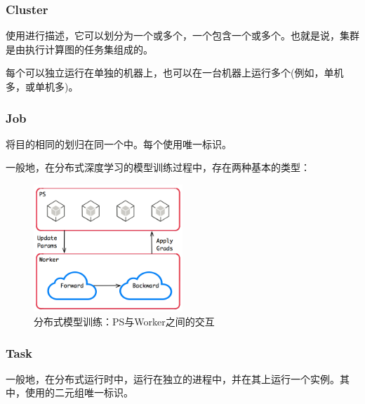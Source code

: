 \begin{content}
\subsubsection{Cluster}

使用进行描述，它可以划分为一个或多个，一个包含一个或多个。也就是说，集群是由执行计算图的任务集组成的。

每个可以独立运行在单独的机器上，也可以在一台机器上运行多个(例如，单机多，或单机多)。

\subsubsection{Job}

将目的相同的划归在同一个中。每个使用唯一标识。

一般地，在分布式深度学习的模型训练过程中，存在两种基本的类型：

\begin{enum}
\end{enum}

\begin{figure}[H]
\centering
\includegraphics[width=0.5\textwidth]{figures/py-dist-ps-worker.png}
\caption{分布式模型训练：PS与Worker之间的交互}
 \label{fig:py-dist-ps-worker}
\end{figure}

\subsubsection{Task}

一般地，在分布式运行时中，运行在独立的进程中，并在其上运行一个实例。其中，使用的二元组唯一标识。


\end{content}
